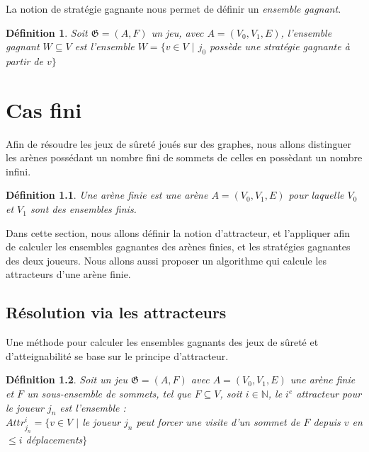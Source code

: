 \documentclass[12pt,a4paper,oneside,titlepage]{report}
\newtheorem{defi}{D\'efinition}[section]
\begin{document}
\noindent La notion de stratégie gagnante nous permet de définir un \emph{ensemble gagnant}. 
\begin{defi}
Soit $\mathfrak{G}=(A,F)$ un jeu, avec $A=(V_0, V_1, E)$, l'\emph{ensemble gagnant} $W\subseteq V$ est l'ensemble $W=\{v\in V$ $|$ $j_0$ possède une stratégie gagnante à partir de $v \}$
\end{defi}


\chapter{Cas fini}
\renewcommand{\leftmark}{CHAPITRE \thechapter.~~Cas fini}
Afin de résoudre les jeux de sûreté joués sur des graphes, nous allons distinguer les arènes possédant un nombre fini de sommets de celles en possèdant un nombre infini. 
\begin{defi}
Une \emph{arène finie} est une arène $A=(V_0, V_1, E)$ pour laquelle $V_0$ et $V_1$ sont des ensembles finis.
\end{defi}
\noindent Dans cette section, nous allons définir la notion d'attracteur, et l'appliquer afin de calculer les ensembles gagnantes des arènes finies, et les stratégies gagnantes des deux joueurs. Nous allons aussi proposer un algorithme qui calcule les attracteurs d'une arène finie.
\section{Résolution via les attracteurs}
Une méthode pour calculer les ensembles gagnants des jeux de sûreté et d'atteignabilité se base sur le principe d'attracteur. 
\begin{defi}
	Soit un jeu $\mathfrak{G} = (A,F)$ avec $A=(V_0, V_1, E)$ une arène finie et $F$ un sous-ensemble de sommets, tel que $F\subseteq V$, soit $i\in \mathbb{N}$, le $i^e$ attracteur pour le joueur $j_n$ est l'ensemble :\\
	$Attr_{j_n}^i=\{v\in V$ $|$ le joueur $j_n$ peut forcer une visite d'un sommet de $F
$ depuis $v$ en $ \leq  i $ déplacements$\}$
\end{defi}
\end{document}
